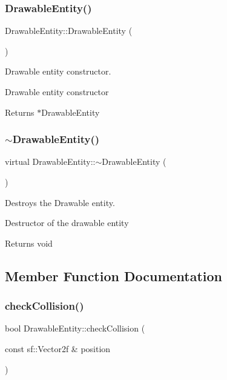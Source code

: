 \subsubsection{\texorpdfstring{Drawable\+Entity()}{DrawableEntity()}}
{\footnotesize\ttfamily Drawable\+Entity\+::\+Drawable\+Entity (\begin{DoxyParamCaption}{ }\end{DoxyParamCaption})}



Drawable entity constructor. 

Drawable entity constructor

\begin{DoxyReturn}{Returns}
$\ast$\+Drawable\+Entity 
\end{DoxyReturn}
\mbox{\label{class_drawable_entity_af688295ed4873a01b32862c3c0241933}} 
\subsubsection{\texorpdfstring{$\sim$\+Drawable\+Entity()}{~DrawableEntity()}}
{\footnotesize\ttfamily virtual Drawable\+Entity\+::$\sim$\+Drawable\+Entity (\begin{DoxyParamCaption}{ }\end{DoxyParamCaption})\hspace{0.3cm}{\ttfamily [virtual]}}



Destroys the Drawable entity. 

Destructor of the drawable entity

\begin{DoxyReturn}{Returns}
void 
\end{DoxyReturn}


\subsection{Member Function Documentation}
\mbox{\label{class_drawable_entity_a4488d49a6e020b228aae6887ca6b644e}} 
\subsubsection{\texorpdfstring{check\+Collision()}{checkCollision()}\hspace{0.1cm}{\footnotesize\ttfamily [1/2]}}
{\footnotesize\ttfamily bool Drawable\+Entity\+::check\+Collision (\begin{DoxyParamCaption}\item[{const sf\+::\+Vector2f \&}]{position }\end{DoxyParamCaption})}



